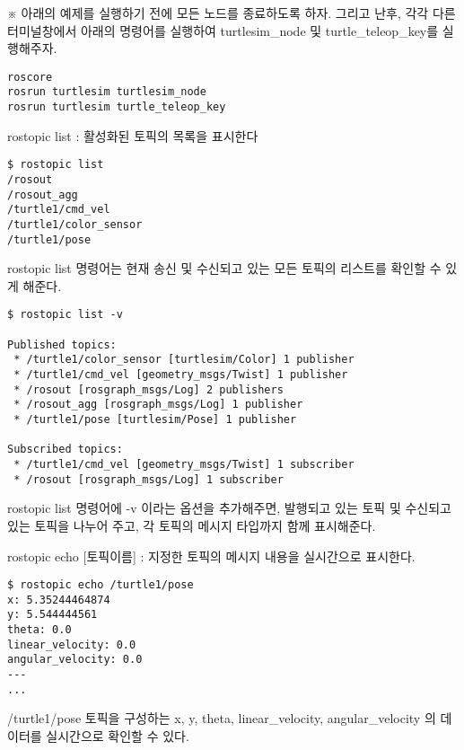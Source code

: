 \vspace{\baselineskip}
\noindent
※ 아래의 예제를 실행하기 전에 모든 노드를 종료하도록 하자. 그리고 난후, 각각 다른 터미널창에서 아래의 명령어를 실행하여 turtlesim\_node 및 turtle\_teleop\_key를 실행해주자.

\begin{lstlisting}[language=ROS]
roscore
rosrun turtlesim turtlesim_node 
rosrun turtlesim turtle_teleop_key
\end{lstlisting}

\setcounter{num}{0}

\vspace{\baselineskip}
\noindent
{}\circled{\thenum} rostopic list : 활성화된 토픽의 목록을 표시한다

\begin{lstlisting}[language=ROS]
$ rostopic list
/rosout
/rosout_agg
/turtle1/cmd_vel
/turtle1/color_sensor
/turtle1/pose
\end{lstlisting}

\noindent
rostopic list 명령어는 현재 송신 및 수신되고 있는 모든 토픽의 리스트를 확인할 수 있게 해준다.

\begin{lstlisting}[language=ROS]
$ rostopic list -v

Published topics:
 * /turtle1/color_sensor [turtlesim/Color] 1 publisher
 * /turtle1/cmd_vel [geometry_msgs/Twist] 1 publisher
 * /rosout [rosgraph_msgs/Log] 2 publishers
 * /rosout_agg [rosgraph_msgs/Log] 1 publisher
 * /turtle1/pose [turtlesim/Pose] 1 publisher

Subscribed topics:
 * /turtle1/cmd_vel [geometry_msgs/Twist] 1 subscriber
 * /rosout [rosgraph_msgs/Log] 1 subscriber
\end{lstlisting}

\noindent
rostopic list 명령어에 -v 이라는 옵션을 추가해주면, 발행되고 있는 토픽 및 수신되고 있는 토픽을 나누어 주고, 각 토픽의 메시지 타입까지 함께 표시해준다.

\vspace{\baselineskip}
\noindent
{}\circled{\thenum} rostopic echo [토픽이름] : 지정한 토픽의 메시지 내용을 실시간으로 표시한다.

\begin{lstlisting}[language=ROS]
$ rostopic echo /turtle1/pose 
x: 5.35244464874
y: 5.544444561
theta: 0.0
linear_velocity: 0.0
angular_velocity: 0.0
---
...
\end{lstlisting}

\noindent
/turtle1/pose 토픽을 구성하는 x, y, theta, linear\_velocity, angular\_velocity 의 데이터를 실시간으로 확인할 수 있다.


